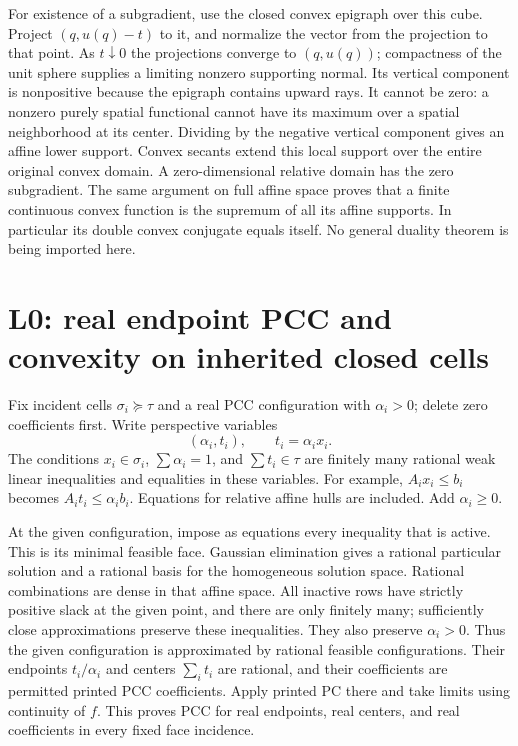 \documentclass[
  11pt,
]{article}
\begin{document}
For existence of a subgradient, use the closed convex epigraph over this
cube. Project \((q,u(q)-t)\) to it, and normalize the vector from the
projection to that point. As \(t\downarrow0\) the projections converge
to \((q,u(q))\); compactness of the unit sphere supplies a limiting
nonzero supporting normal. Its vertical component is nonpositive because
the epigraph contains upward rays. It cannot be zero: a nonzero purely
spatial functional cannot have its maximum over a spatial neighborhood
at its center. Dividing by the negative vertical component gives an
affine lower support. Convex secants extend this local support over the
entire original convex domain. A zero-dimensional relative domain has
the zero subgradient. The same argument on full affine space proves that
a finite continuous convex function is the supremum of all its affine
supports. In particular its double convex conjugate equals itself. No
general duality theorem is being imported here.

\section{L0: real endpoint PCC and convexity on inherited closed
cells}\label{l0-real-endpoint-pcc-and-convexity-on-inherited-closed-cells}

Fix incident cells \(\sigma_i\succeq\tau\) and a real PCC configuration
with \(\alpha_i>0\); delete zero coefficients first. Write perspective
variables \[ (\alpha_i,t_i),\qquad t_i=\alpha_i x_i. \] The conditions
\(x_i\in\sigma_i\), \(\sum\alpha_i=1\), and \(\sum t_i\in\tau\) are
finitely many rational weak linear inequalities and equalities in these
variables. For example, \(A_i x_i\leq b_i\) becomes
\(A_i t_i\leq\alpha_i b_i\). Equations for relative affine hulls are
included. Add \(\alpha_i\geq0\).

At the given configuration, impose as equations every inequality that is
active. This is its minimal feasible face. Gaussian elimination gives a
rational particular solution and a rational basis for the homogeneous
solution space. Rational combinations are dense in that affine space.
All inactive rows have strictly positive slack at the given point, and
there are only finitely many; sufficiently close approximations preserve
these inequalities. They also preserve \(\alpha_i>0\). Thus the given
configuration is approximated by rational feasible configurations. Their
endpoints \(t_i/\alpha_i\) and centers \(\sum_i t_i\) are rational, and
their coefficients are permitted printed PCC coefficients. Apply printed
PC there and take limits using continuity of \(f\). This proves PCC for
real endpoints, real centers, and real coefficients in every fixed face
incidence.
\end{document}
